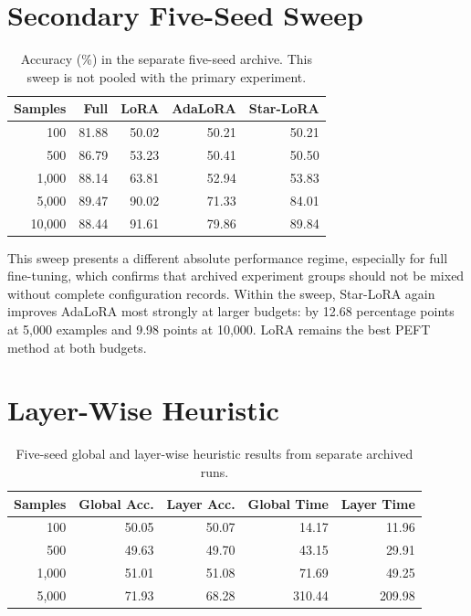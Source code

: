 \section{Secondary Five-Seed Sweep}

\begin{table}[H]
\centering
\caption{Accuracy (\%) in the separate five-seed archive. This sweep is not pooled with the
primary experiment.}
\label{tab:secondary}
\begin{tabular}{@{}rrrrr@{}}
\toprule
Samples & Full & LoRA & AdaLoRA & Star-LoRA \\
\midrule
100 & 81.88 & 50.02 & 50.21 & 50.21 \\
500 & 86.79 & 53.23 & 50.41 & 50.50 \\
1,000 & 88.14 & 63.81 & 52.94 & 53.83 \\
5,000 & 89.47 & 90.02 & 71.33 & 84.01 \\
10,000 & 88.44 & 91.61 & 79.86 & 89.84 \\
\bottomrule
\end{tabular}
\end{table}

This sweep presents a different absolute performance regime, especially for full fine-tuning,
which confirms that archived experiment groups should not be mixed without complete configuration
records. Within the sweep, Star-LoRA again improves AdaLoRA most strongly at larger budgets: by
12.68 percentage points at 5,000 examples and 9.98 points at 10,000. LoRA remains the best PEFT
method at both budgets.

\section{Layer-Wise Heuristic}

\begin{table}[H]
\centering
\caption{Five-seed global and layer-wise heuristic results from separate archived runs.}
\label{tab:layerwise}
\begin{tabular}{@{}rrrrr@{}}
\toprule
Samples & Global Acc. & Layer Acc. & Global Time & Layer Time \\
\midrule
100 & 50.05 & 50.07 & 14.17 & 11.96 \\
500 & 49.63 & 49.70 & 43.15 & 29.91 \\
1,000 & 51.01 & 51.08 & 71.69 & 49.25 \\
5,000 & 71.93 & 68.28 & 310.44 & 209.98 \\
\bottomrule
\end{tabular}
\end{table}

